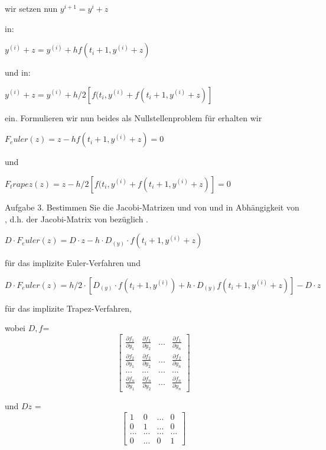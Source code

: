 wir setzen nun
$ y^{i+1} = y^i + z $

in:

$ y^(i) + z = y^(i) + hf(t_i+1,y^(i) + z) $

und in:

$ y^(i) + z = y^(i) + h/2 [f(t_i, y^(i) + f(t_i+1,y^(i) + z)] $

ein. Formulieren wir nun beides als Nullstellenproblem für  erhalten wir

$ F_euler(z) = z - hf(t_i+1, y^(i) + z) = 0 $

und 

$F_trapez(z) =  z - h/2 [f(t_i, y^(i) + f(t_i+1,y^(i) + z)] = 0$

Aufgabe 3.
Bestimmen Sie die Jacobi-Matrizen  und  von  und  in Abhängigkeit von , d.h. der Jacobi-Matrix von  bezüglich .

$ D\cdot F_euler(z) = D\cdot z - h\cdot D_(y)\cdot f(t_i+1, y^(i) + z) $

für das implizite Euler-Verfahren und

$ D\cdot F_euler(z) = h/2\cdot [D_(y)\cdot f(t_i+1, y^(i)) +  h\cdot D_(y)f(t_i+1, y^(i) + z)] - D\cdot z $

für das implizite Trapez-Verfahren,

wobei $D, f $=
\begin{equation}
\begin{bmatrix}
	\frac{\partial f_1 }{\partial y_1} & \frac{\partial f_1 }{\partial y_2} & ... & \frac{\partial f_1 }{\partial y_n} \\
	\frac{\partial f_2 }{\partial y_1} & \frac{\partial f_2 }{\partial y_2} & ... & \frac{\partial f_2 }{\partial y_n} \\
	... & ... & ... & ... \\
	\frac{\partial f_n }{\partial y_1} & \frac{\partial f_n }{\partial y_2} & ... & \frac{\partial f_n }{\partial y_n} 
\end{bmatrix} 
\end{equation}


und $Dz$ =
\begin{equation}
\begin{bmatrix}
	1 & 0 & ... & 0 \\
	0 & 1 & ... & 0 \\
	... & ... & ... & ... \\
	0 & ... & 0 & 1 
\end{bmatrix}  
\end{equation}



